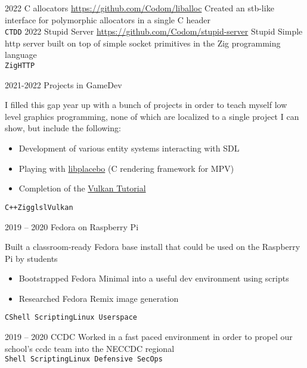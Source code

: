 \documentclass[9pt]{developercv} %
\begin{document}

\begin{entrylist}
	\entry
		{2022}
        {C allocators}
        {\href{https://github.com/Codom/liballoc}{https://github.com/Codom/liballoc}}
        {Created an stb-like interface for polymorphic allocators in a single C header\\
        \texttt{C}\slashsep\texttt{TDD}}
	\entry
		{2022}
        {Stupid Server}
        {\href{https://github.com/Codom/stupid-server}{https://github.com/Codom/stupid-server}}
        {Stupid Simple http server built on top of simple socket primitives
        in the Zig programming language\\
        \texttt{Zig}\slashsep\texttt{HTTP}}
\end{entrylist}


\begin{entrylist}
	\entry
		{2021-2022}
		{Projects in GameDev}
        {}
        {I filled this gap year up with a bunch of projects in order to teach myself low level graphics programming,
        none of which are localized to a single project I can show, but include the following:
        \begin{itemize}\itemsep=0em
            \item Development of various entity systems interacting with SDL
            \item Playing with \href{https://github.com/haasn/libplacebo}{libplacebo} (C rendering framework for MPV)
            \item Completion of the \href{https://github.com/Codom/Vulkan-Tutorial}{Vulkan Tutorial}
        \end{itemize}
        \texttt{C++}\slashsep\texttt{Zig}\slashsep\texttt{glsl}\slashsep\texttt{Vulkan}}
	\entry
		{2019 -- 2020}
		{Fedora on Raspberry Pi}
        {}
        {
	Built a classroom-ready Fedora base install that could be used on the Raspberry Pi by students
	\begin{itemize}\itemsep=0em
		\item Bootstrapped Fedora Minimal into a useful dev environment using scripts
		\item Researched Fedora Remix image generation
	\end{itemize}
	\texttt{C}\slashsep\texttt{Shell Scripting}\slashsep\texttt{Linux Userspace}}
	\entry
		{2019 -- 2020}
		{CCDC}
        {}
        {Worked in a fast paced environment in order to propel our school's ccdc team into
	the NECCDC regional\\
        \texttt{Shell Scripting}\slashsep\texttt{Linux Defensive SecOps}}
\end{entrylist}
\end{document}

